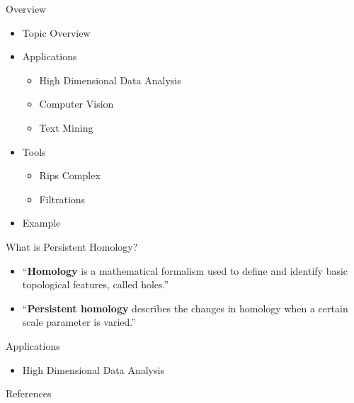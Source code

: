 






\begin{frame}
    \titlepage
\end{frame}

\begin{frame}{Overview}
	\begin{itemize}[<+->]
		\item Topic Overview
		\item Applications
			\begin{itemize}[<+->]
				\item High Dimensional Data Analysis
				\item Computer Vision
				\item Text Mining
			\end{itemize}
		\item Tools
			\begin{itemize}[<+->]
				\item Rips Complex
				\item Filtrations
			\end{itemize}
		\item Example
	\end{itemize}
\end{frame}

\begin{frame}{What is Persistent Homology?}
	\begin{itemize}[<+->]
		\item ``\textbf{Homology} is a mathematical formalism used to deﬁne and identify basic topological features, called holes.'' \cite{wagner}
		\item ``\textbf{Persistent homology} describes the changes in homology when a certain scale parameter is varied.'' \cite{wagner}
	\end{itemize}
\end{frame}

\begin{frame}{Applications}
	\begin{itemize}[<+->]
		\item High Dimensional Data Analysis \cite{ghrist}
	\end{itemize}
\end{frame}



\begin{frame}{References}
	
\end{frame}





